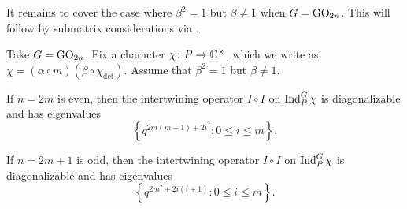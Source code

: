 It remains to cover the case where $\beta^2=1$ but $\beta\ne1$ when $G=\mathrm{GO}_{2n}$. This will follow by submatrix considerations via .
\begin{theorem} \label{thm:go-quad-eigens}
    Take $G=\mathrm{GO}_{2n}$. Fix a character $\chi\colon P\to\mathbb C^\times$, which we write as $\chi=(\alpha\circ m)(\beta\circ\chi_{\det})$. Assume that $\beta^2=1$ but $\beta\ne1$.
    \begin{listalph}
        \item If $n=2m$ is even, then the intertwining operator $I\circ I$ on $\operatorname{Ind}_P^G\chi$ is diagonalizable and has eigenvalues
        \[\left\{q^{2m(m-1)+2i^2}:0\le i\le m\right\}.\]
        \item If $n=2m+1$ is odd, then the intertwining operator $I\circ I$ on $\operatorname{Ind}_P^G\chi$ is diagonalizable and has eigenvalues
        \[\left\{q^{2m^2+2i(i+1)}:0\le i\le m\right\}.\]
    \end{listalph}
\end{theorem}
